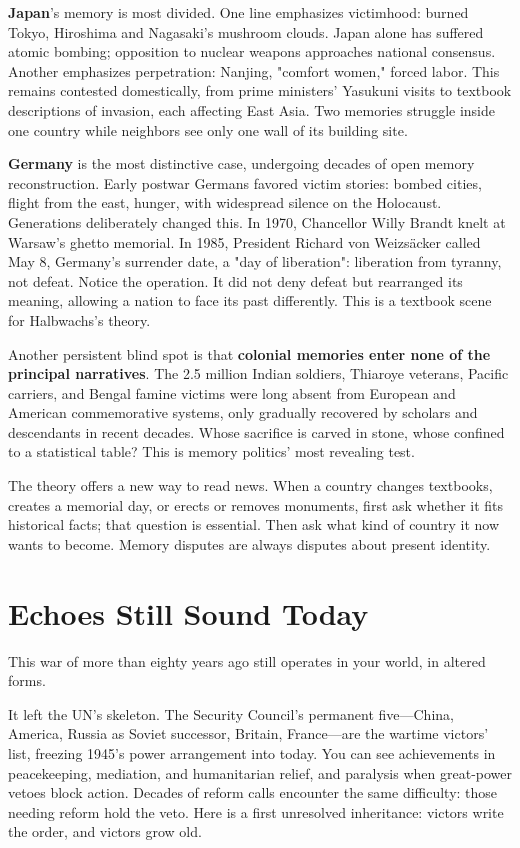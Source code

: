 \textbf{Japan}'s memory is most divided. One line emphasizes victimhood: burned Tokyo, Hiroshima and Nagasaki's mushroom clouds. Japan alone has suffered atomic bombing; opposition to nuclear weapons approaches national consensus. Another emphasizes perpetration: Nanjing, "comfort women," forced labor. This remains contested domestically, from prime ministers' Yasukuni visits to textbook descriptions of invasion, each affecting East Asia. Two memories struggle inside one country while neighbors see only one wall of its building site.

\textbf{Germany} is the most distinctive case, undergoing decades of open memory reconstruction. Early postwar Germans favored victim stories: bombed cities, flight from the east, hunger, with widespread silence on the Holocaust. Generations deliberately changed this. In 1970, Chancellor Willy Brandt knelt at Warsaw's ghetto memorial. In 1985, President Richard von Weizsäcker called May 8, Germany's surrender date, a "day of liberation": liberation from tyranny, not defeat. Notice the operation. It did not deny defeat but rearranged its meaning, allowing a nation to face its past differently. This is a textbook scene for Halbwachs's theory.

Another persistent blind spot is that \textbf{colonial memories enter none of the principal narratives}. The 2.5 million Indian soldiers, Thiaroye veterans, Pacific carriers, and Bengal famine victims were long absent from European and American commemorative systems, only gradually recovered by scholars and descendants in recent decades. Whose sacrifice is carved in stone, whose confined to a statistical table? This is memory politics' most revealing test.

The theory offers a new way to read news. When a country changes textbooks, creates a memorial day, or erects or removes monuments, first ask whether it fits historical facts; that question is essential. Then ask what kind of country it now wants to become. Memory disputes are always disputes about present identity.

\section{Echoes Still Sound Today}
This war of more than eighty years ago still operates in your world, in altered forms.

It left the UN's skeleton. The Security Council's permanent five---China, America, Russia as Soviet successor, Britain, France---are the wartime victors' list, freezing 1945's power arrangement into today. You can see achievements in peacekeeping, mediation, and humanitarian relief, and paralysis when great-power vetoes block action. Decades of reform calls encounter the same difficulty: those needing reform hold the veto. Here is a first unresolved inheritance: victors write the order, and victors grow old.

